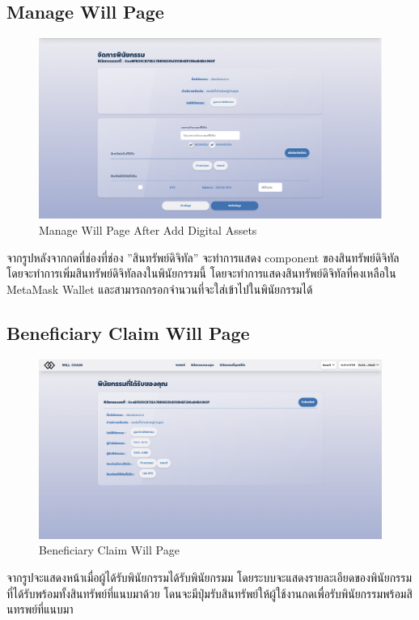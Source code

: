 \documentclass[12pt,oneside,openright,a4paper]{cpe-thai-project}
\begin{document}
\clearpage
\subsection{Manage Will Page}
	\begin{figure}[!thb]
			\centering
			\includegraphics[scale=0.2]{manageWillFullAsset4}
			\caption{Manage Will Page After Add Digital Assets }
		\end{figure}
		\FloatBarrier
\tab จากรูปหลังจากกดที่ช่องที่ช่อง ''สินทรัพย์ดิจิทัล'' จะทำการแสดง component ของสินทรัพย์ดิจิทัล โดยจะทำการเพิ่มสินทรัพย์ดิจิทัลลงในพินัยกรรมนี้ โดยจะทำการแสดงสินทรัพย์ดิจิทัลที่คงเหลือใน MetaMask Wallet และสามารถกรอกจำนวนที่จะใส่เข้าไปในพินัยกรรมได้

\subsection{Beneficiary Claim Will Page }
	\begin{figure}[!thb]
			\centering
			\includegraphics[scale=0.2]{claimWillBefore4}
			\caption{Beneficiary Claim Will Page }
		\end{figure}
		\FloatBarrier
\tab จากรูปจะแสดงหน้าเมื่อผู้ได้รับพินัยกรรมได้รับพินัยกรมม โดยระบบจะแสดงรายละเอียดของพินัยกรรมที่ได้รับพร้อมทั้งสินทรัพย์ที่แนบมาด้วย โดนจะมีปุ่มรับสินทรัพย์ให้ผู้ใช้งานกดเพื่อรับพินัยกรรมพร้อมสินทรพย์ที่แนบมา
\end{document}
